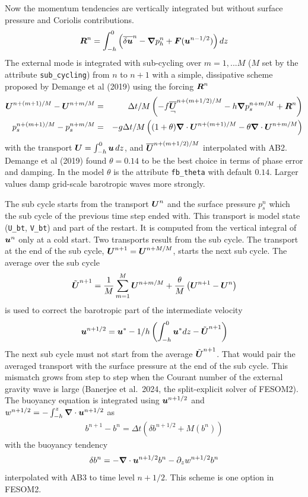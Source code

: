 \documentclass[12pt]{article}
\newcommand{\beq}  { \begin{eqnarray} }
\newcommand{\eeq}  { \end{eqnarray}}
\renewcommand{\v}[1]{{\mbox{\boldmath$ #1 $}}}  %
\newcommand{\Bar}[1]{ \overline{ #1} }
\newcommand{\rvec} [1]{
    \raisebox{-1.5ex}{$\stackrel{\textstyle #1}{\neg}$} }%
\newcommand{\p}{{\partial}}
\newcommand{\vn}{{\v \nabla}}
\newcommand{\lk}{\left(}
\newcommand{\rk}{\right)}
\newcommand{\tl}{\tilde}
\begin{document}
Now the momentum tendencies are vertically integrated but without
surface pressure and Coriolis contributions.
\beq
 \v R^n = \int_{-h}^0  \lk  \Bar{\delta \v u}^{n}  - \vn  p_h^n+ \v F(\v u^{n-1/2}) \rk dz 
\eeq
The external mode is integrated with sub-cycling over $m=1, ...M$
($M$ set by the attribute \verb|sub_cycling|) from $n$ to $n+1$ with
a simple, dissipative  scheme proposed by Demange et al (2019) using the forcing $\v R^n$
\beq
\v U^{n+(m+1)/M} - \v U^{n+m/M} &=& \Delta t/M \lk - f  \rvec{\Bar{\v U}}^{n+(m+1/2)/M} -  h \vn p_s^{n+m/M} + 
 \v R^n  \rk
 \\
 p_s^{n+(m+1)/M} - p_s^{n+m/M} &=& - g \Delta t/M \lk  (1+\theta)  \vn \cdot \v U^{n+(m+1)/M} 
 - \theta   \vn \cdot \v U^{n+m/M}
 \rk
\eeq
with the transport $\v U = \int_{-h}^0 \v u\, dz$, and $\Bar{\v U}^{n+(m+1/2)/M}$ interpolated
with AB2.   Demange et al (2019)  found  $\theta=0.14$ to be the best choice in terms of phase error and damping.
In the model $\theta$ is the attribute \verb|fb_theta| with default $0.14$.
Larger values damp grid-scale barotropic waves more strongly.

The sub cycle starts from the transport $\v U^n$ and the surface pressure $p_s^n$ which the
sub cycle of the previous time step ended with.
This transport is model state (\verb|U_bt|, \verb|V_bt|) and part of the restart.
It is computed from the vertical integral of $\v u^n$ only at a cold start.
Two transports result from the sub cycle.
The transport at the end of the sub cycle, $\v U^{n+1} = \v U^{n+M/M}$, starts the next sub cycle.
The average over the sub cycle
\beq
\tl{\v U}^{n+1}=\frac{1}{M} \sum_{m=1}^{M} \v U^{n+m/M}  + \frac{\theta}{M} \lk  \v U^{n+1} - \v U^n  \rk
\eeq
is used to correct the barotropic part of the intermediate velocity
\beq
  \v u^{n+1/2} = \v u^* -1/h \lk  \int_{-h}^0 \v u^* dz - \tl{\v U}^{n+1} \rk
\eeq
The next sub cycle must not start from the average $\tl{\v U}^{n+1}$.
That would pair the averaged transport with the surface pressure at the end of the sub cycle.
This mismatch grows from step to step when the Courant number of the external
gravity wave is large (Banerjee et al.\ 2024, the split-explicit solver of FESOM2).
The buoyancy equation is integrated using $\v u^{n+1/2}$ and $w^{n+1/2} = - \int_{-h}^z \vn \cdot \v u^{n+1/2}$
as
\beq
  b^{n+1}- b^n = \Delta t \lk  \delta b^{n+1/2} + M (b^{n})    \rk 
\eeq
with the buoyancy tendency
\beq
\delta b^n =  - \vn \cdot \v u^{n+1/2} b^n - \p_z w^{n+1/2} b^n
 \eeq
 interpolated with AB3 to time level $n+1/2$.
 This scheme is one option in FESOM2.
\end{document}
